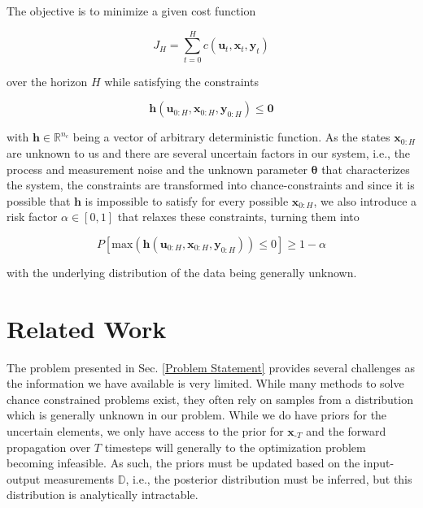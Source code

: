 The objective is to minimize a given cost function 

\begin{equation} \label{cost function}
J_H = \sum_{t = 0}^H c(\boldsymbol{u}_t,  \boldsymbol{x}_t,  \boldsymbol{y}_t)
\end{equation}

over the horizon $H$ while satisfying the constraints 

\begin{equation} \label{constraints}
\boldsymbol{h}(\boldsymbol{u}_{0:H},  \boldsymbol{x}_{0:H},  \boldsymbol{y}_{0:H}) \leq \boldsymbol{0}
\end{equation}

with $\boldsymbol{h} \in \mathbb{R}^{n_c}$ being a vector of arbitrary deterministic function. As the states $\boldsymbol{x}_{0:H}$ are unknown to us and there are several uncertain factors in our system, i.e., the process and measurement noise and the unknown parameter $\boldsymbol{\theta}$ that characterizes the system, the constraints are transformed into chance-constraints and since it is possible that $\boldsymbol{h}$ is impossible to satisfy for every possible $\boldsymbol{x}_{0:H}$, we also introduce a risk factor $\alpha \in [0, 1]$ that relaxes these constraints, turning them into

\begin{equation} \label{risk constraints}
P \left[ \text{max} (\boldsymbol{h}(\boldsymbol{u}_{0:H},  \boldsymbol{x}_{0:H},  \boldsymbol{y}_{0:H})) \leq 0 \right] \geq 1 - \alpha
\end{equation}

with the underlying distribution of the data being generally unknown.

\section{Related Work} \label{Related Work}


The problem presented in Sec. \ref{Problem Statement} provides several challenges as the information we have available is very limited. While many methods to solve chance constrained problems exist, they often rely on samples from a distribution which is generally unknown in our problem. While we do have priors for the uncertain elements, we only have access to the prior for $\boldsymbol{x}_{\text{-}T}$ and the forward propagation over $T$ timesteps will generally to the optimization problem becoming infeasible. As such, the priors must be updated based on the input-output measurements $\mathbb{D}$, i.e., the posterior distribution must be inferred, but this distribution is analytically intractable.

